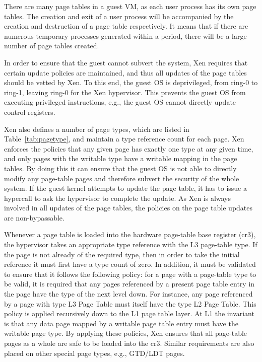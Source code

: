 There are many page tables in a guest VM, as each user process has its own page tables.
The creation and exit of a user process will be accompanied by the creation and destruction of a page table respectively.
It means that if there are numerous temporary processes generated within a period, there will be a large number of page tables created.

In order to ensure that the guest cannot subvert the system, Xen requires that certain update policies are maintained,
and thus all updates of the page tables should be vetted by Xen.
To this end, the guest OS is deprivileged, from ring-0 to ring-1, leaving ring-0 for the Xen hypervisor.
This prevents the guest OS from executing privileged instructions, e.g., the guest OS cannot directly update control registers.

Xen also defines a number of page types, which are listed in Table~\ref{tab:pagetype}, and maintain a type reference count for each page.
Xen enforces the policies that any given page has exactly one type at any given time,
and only pages with the writable type have a writable mapping in the page tables.
By doing this it can ensure that the guest OS is not able to directly modify any page-table pages and therefore subvert the security of the whole system.
If the guest kernel attempts to update the page table, it has to issue a hypercall to ask the hypervisor to complete the update.
As Xen is always involved in all updates of the page tables, the policies on the page table updates are non-bypassable.

Whenever a page table is loaded into the hardware page-table base register (cr3),
the hypervisor takes an appropriate type reference with the L3 page-table type.
If the page is not already of the required type, then in order to take the initial reference it must first have a type count of zero.
In addition, it must be validated to ensure that it follows the following policy:
for a page with a page-table type to be valid, it is required that any pages referenced
by a present page table entry in the page have the type of the next level down.
For instance, any page referenced by a page with type L3 Page Table must itself have the type L2 Page Table.
This policy is applied recursively down to the L1 page table layer.
At L1 the invariant is that any data page mapped by a writable page table entry must have the writable page type.
By applying these policies, Xen ensures that all page-table pages as a whole are safe to be loaded into the cr3.
Similar requirements are also placed on other special page types, e.g., GTD/LDT pages.

